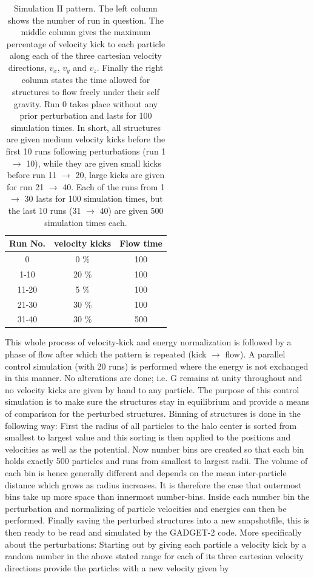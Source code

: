 \begin{table}[!htbp]
\centering
\begin{tabular}{|c|c|c|}
 \hline
 Run No. & velocity kicks &  Flow time  \\ \hline
   0     &     0 $\%$     &     100     \\ \hline
 1-10    &    20 $\%$     &     100     \\ \hline
 11-20	 &     5 $\%$     &     100     \\ \hline
 21-30	 &    30 $\%$     &     100     \\ \hline
 31-40	 &    30 $\%$     &     500     \\ \hline
\end{tabular}
\caption {Simulation II pattern. The left column shows the number of run in question. 
The middle column gives the maximum percentage of velocity kick to each particle along each of the three cartesian velocity directions, $v_x$, $v_y$ and $v_z$. Finally the right column states the time allowed for structures to flow freely under their self gravity. Run 0 takes place without any prior perturbation and lasts for 100 simulation times. In short, all structures are given medium velocity kicks before the first 10 runs following perturbations (run 1 $\rightarrow$ 10), while they are given small kicks before run 11 $\rightarrow$ 20, large kicks are given for run 21 $\rightarrow$ 40. Each of the runs from 1 $\rightarrow$ 30 lasts for 100 simulation times, but the last 10 runs (31 $\rightarrow$ 40) are given 500 simulation times each.}
\end{table}

This whole process of velocity-kick and energy normalization is followed by a phase of flow after which the pattern is repeated (kick $\rightarrow$ flow). A parallel control simulation (with 20 runs) is performed where the energy is not exchanged in this manner. No alterations are done; i.e. G remains at unity throughout and no velocity kicks are given by hand to any particle. The purpose of this control simulation is to make sure the structures stay in equilibrium and provide a means of comparison for the perturbed structures. 
Binning of structures is done in the following way:
First the radius of all particles to the halo center is sorted from smallest to largest value and this sorting is then applied to the positions and velocities as well as the potential. Now number bins are created so that each bin holds exactly 500 particles and runs from smallest to largest radii. The volume of each bin is hence generally different and depends on the mean inter-particle distance which grows as radius increases. It is therefore the case that outermost bins take up more space than innermost number-bins. Inside each number bin the perturbation and normalizing of particle velocities and energies can then be performed. Finally saving the perturbed structures into a new snapshotfile, this is then ready to be read and simulated by the GADGET-2 code. More specifically about the perturbations:
Starting out by giving each particle a velocity kick by a random number in the above stated range for each of its three cartesian velocity directions provide the particles with a new velocity given by 

